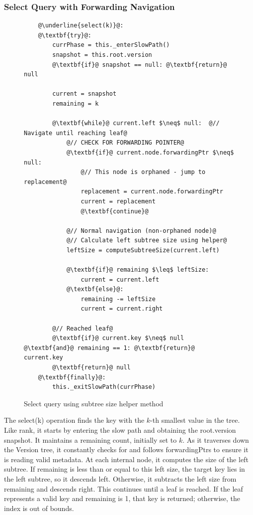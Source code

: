 \documentclass[acmsmall,screen,nonacm]{acmart}
\newcommand{\codestyle}[1]{{{\fontsize{9}{10}\ttfamily #1}}}
\begin{document}
\subsubsection{Select Query with Forwarding Navigation}

\begin{figure}[H]
\begin{lstlisting}
    @\underline{select(k)}@:
    @\textbf{try}@:
        currPhase = this._enterSlowPath()
        snapshot = this.root.version
        @\textbf{if}@ snapshot == null: @\textbf{return}@ null
        
        current = snapshot
        remaining = k
        
        @\textbf{while}@ current.left $\neq$ null:  @// Navigate until reaching leaf@
            @// CHECK FOR FORWARDING POINTER@
            @\textbf{if}@ current.node.forwardingPtr $\neq$ null:
                @// This node is orphaned - jump to replacement@
                replacement = current.node.forwardingPtr
                current = replacement
                @\textbf{continue}@
            
            @// Normal navigation (non-orphaned node)@
            @// Calculate left subtree size using helper@
            leftSize = computeSubtreeSize(current.left)
            
            @\textbf{if}@ remaining $\leq$ leftSize:
                current = current.left
            @\textbf{else}@:
                remaining -= leftSize
                current = current.right
        
        @// Reached leaf@
        @\textbf{if}@ current.key $\neq$ null @\textbf{and}@ remaining == 1: @\textbf{return}@ current.key
        @\textbf{return}@ null
    @\textbf{finally}@:
        this._exitSlowPath(currPhase)
\end{lstlisting}
\caption{Select query using subtree size helper method}
\label{fig:select-with-forwarding}
\end{figure}

The \codestyle{select(k)} operation finds the key with the $k$-th smallest value in the tree. Like \codestyle{rank}, it starts by entering the slow path and obtaining the \codestyle{root.version} snapshot. It maintains a \codestyle{remaining} count, initially set to $k$. As it traverses down the Version tree, it constantly checks for and follows \codestyle{forwardingPtrs} to ensure it is reading valid metadata. At each internal node, it computes the size of the left subtree. If \codestyle{remaining} is less than or equal to this left size, the target key lies in the left subtree, so it descends left. Otherwise, it subtracts the left size from \codestyle{remaining} and descends right. This continues until a leaf is reached. If the leaf represents a valid key and \codestyle{remaining} is 1, that key is returned; otherwise, the index is out of bounds.
\end{document}
